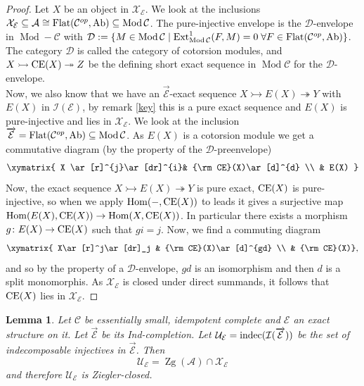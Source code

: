 \documentclass[11pt,a4paper]{amsart}
\theoremstyle{plain}
\newtheorem{lem}[thm]{Lemma}
\theoremstyle{definition}
\DeclareMathOperator{\Hom}{Hom}
\DeclareMathOperator{\Ext}{Ext}
\DeclareMathOperator{\Modu}{Mod}
\newcommand{\defl}{\twoheadrightarrow}
\newcommand{\infl}{\rightarrowtail}
\newcommand{\mcA}{\mathcal{A}}
\newcommand{\mcC}{\mathcal{C}}
\newcommand{\mcD}{\mathcal{D}}
\newcommand{\mcE}{\mathcal{E}}
\newcommand{\mcI}{\mathcal{I}}
\newcommand{\mcU}{\mathcal{U}}
\newcommand{\mcX}{\mathcal{X}}
\DeclareMathOperator{\Zg}{Zg}
\begin{document}
\begin{proof}
Let $X$ be an object in $\mcX_{\mcE}$. We look at the inclusions $\mcX_{\mcE} \subseteq \mcA\cong {\rm Flat} (\mcC^{op}, {\rm Ab})\subseteq \Modu \mcC$. 
The pure-injective envelope is the $\mcD$-envelope in $\Modu-\mcC$ with $\mcD:=\{M\in \Modu \mcC\mid \Ext^1_{\Modu \mcC} (F,M)=0 \; \forall F \in {\rm Flat} (\mcC^{op}, {\rm Ab})\}$. The category $\mcD$ is called the category of cotorsion modules, and $X\infl {\rm CE}(X) \defl Z$ be the defining short exact sequence in $\Modu \mcC$ for the $\mcD$-envelope. \\
Now, we also know that we have an $\overrightarrow{\mcE}$-exact sequence $X\infl E(X) \defl Y$ with $E(X)$ in $\mcI(\mcE)$, by remark \ref{key} this is a pure exact sequence and $E(X)$ is pure-injective and lies in $\mcX_{\mcE}$.
We look at the inclusion $\overrightarrow{\mcE}={\rm Flat} (\mcC^{op}, \rm Ab)\subseteq \Modu \mcC$. %
As $E(X)$ is a cotorsion module we get a commutative diagram (by the property of the $\mcD$-preenvelope)
\[
\xymatrix{
X \ar[r]^{j}\ar[dr]^{i}& {\rm CE}(X)\ar[d]^{d} \\
& E(X)
}
\]
Now, the exact sequence $X \infl E(X) \defl Y$ is pure exact, ${\rm CE}(X)$ is pure-injective, so when we apply $\Hom (-, {\rm CE}(X))$ to leads it gives a surjective map $\Hom (E(X), {\rm CE}(X)) \to \Hom (X, {\rm CE}(X))$. In particular there exists a morphism $g\colon E(X) \to {\rm CE}(X)$ such that $gi=j$. Now, we find a commuting diagram 
\[
\xymatrix{
X\ar[r]^j\ar[dr]_j & {\rm CE}(X)\ar[d]^{gd} \\
& {\rm CE}(X)},\]
and so by the property of a $\mcD$-envelope, $gd$ is an isomorphism and then $d$ is a split monomorphis. As $\mcX_{\mcE}$ is closed under direct summands, it follows that ${\rm CE}(X)$ lies in $\mcX_{\mcE}$. 
\end{proof}

\begin{lem} \label{basicDef} 
Let $\mcC$ be essentially small, idempotent complete  and $\mcE$ an exact structure on it. Let $\overrightarrow{\mcE}$ be its Ind-completion. 
Let $\mcU_{\mcE}={\rm indec } (\mcI(\overrightarrow{\mcE}))$ be the set of indecomposable injectives in $\overrightarrow{\mcE}$. Then 
\[
\mcU_{\mcE}=\Zg (\mcA) \cap \mcX_{\mcE}
\]
and therefore $\mcU_{\mcE}$ is Ziegler-closed. 
\end{lem}
\end{document}
